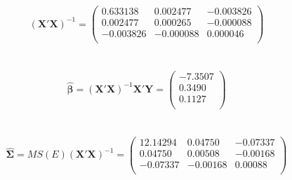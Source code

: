 $$(\textbf{X}'\textbf{X})^{-1} = \left(\begin{array}{ccc} 0.633138 &0.002477&-0.003826\\ 0.002477 & 0.000265 & -0.000088\\ -0.003826 &-0.000088 &0.000046 \\\end{array}\right)$$
~\\~\\
$$\hat{\boldsymbol{\beta}}= (\textbf{X}'\textbf{X})^{-1} \textbf{X}'\textbf{Y} = \left(\begin{array}{cc} -7.3507\\  0.3490\\ 0.1127\\\end{array}\right)$$
~\\~\\
$$\hat{\boldsymbol{\Sigma}}=MS(E)(\textbf{X}'\textbf{X})^{-1} = \left(\begin{array}{ccc}
 12.14294&  0.04750& -0.07337\\
 0.04750  &0.00508 &-0.00168\\
 -0.07337 &-0.00168&  0.00088\\
\end{array}\right)$$

\newpage

